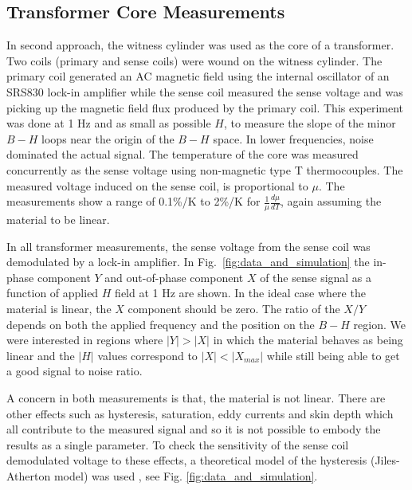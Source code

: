 \documentclass[review]{elsarticle}
\begin{document}

\subsection{Transformer Core Measurements}
In second approach, the witness cylinder was used as the core of a
transformer. Two coils (primary and sense coils) were wound on the
witness cylinder. The primary coil generated an AC magnetic field
using the internal oscillator of an SRS830 lock-in amplifier while the
sense coil measured the sense voltage and was picking up the magnetic
field flux produced by the primary coil. This experiment was done at 1
Hz and as small as possible $H$,
to measure the slope of the minor $B-H$ loops near the origin of the
$B-H$ space. In lower frequencies, noise dominated the actual signal.
The temperature of the core was measured concurrently as the sense
voltage using non-magnetic type T thermocouples.  The measured voltage
induced on the sense coil, is proportional to $\mu$.  The measurements
show a range of 0.1\%/K to 2\%/K for $\frac{1}{\mu}\frac{d\mu}{dT}$,
again assuming the material to be linear.

In all transformer measurements, the sense voltage from the sense coil
was demodulated by a lock-in amplifier. In
Fig.~\ref{fig:data_and_simulation} the in-phase component $Y$ and
out-of-phase component $X$ of the sense signal as a function of
applied $H$ field at 1 Hz are shown. In the ideal case where the
material is linear, the $X$ component should be zero. The ratio of the
$X/Y$ depends on both the applied frequency and the position on the
$B-H$ region. We were interested in regions where $\vert Y \vert >
\vert X \vert $ in which the material behaves as being linear and the
$\vert H \vert $ values correspond to $\vert X \vert < \vert X_{max}
\vert$ while still being able to get a good signal to noise ratio.


A concern in both measurements is that, the material is not
linear. There are other effects such as hysteresis, saturation, eddy
currents and skin depth which all contribute to the measured signal
and so it is not possible to embody the results as a single parameter.
To check the sensitivity of the sense coil demodulated voltage to
these effects, a theoretical model of the hysteresis (Jiles-Atherton
model) was used \cite{bib:jiles}, see Fig.
\ref{fig:data_and_simulation}.
\end{document}
